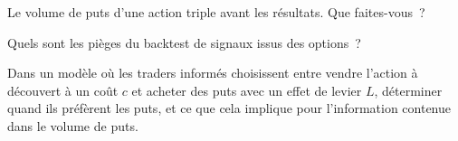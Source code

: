 \begin{interviewq}\label{iq:s1:options-implied-signals-for-stocks:4}
Le volume de puts d'une action triple avant les résultats. Que faites-vous~?
\end{interviewq}

\begin{interviewq}\label{iq:s1:options-implied-signals-for-stocks:5}
Quels sont les pièges du backtest de signaux issus des options~?
\end{interviewq}

\begin{interviewq}\label{iq:s1:options-implied-signals-for-stocks:6}
Dans un modèle où les traders informés choisissent entre vendre l'action à découvert à un coût $c$ et acheter des puts avec un effet de levier $L$, déterminer quand ils préfèrent les puts, et
ce que cela implique pour l'information contenue dans le volume de puts.
\end{interviewq}
